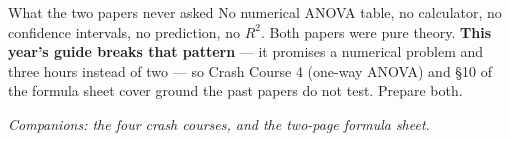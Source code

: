 \documentclass[11pt]{article}
\begin{document}
\begin{idea}{What the two papers never asked}
No numerical ANOVA table, no calculator, no confidence intervals, no prediction, no $R^2$.
Both papers were pure theory. \textbf{This year's guide breaks that pattern} --- it promises
a numerical problem and three hours instead of two --- so Crash Course 4 (one-way ANOVA) and
\S10 of the formula sheet cover ground the past papers do not test. Prepare both.
\end{idea}

\vfill
\begin{center}\small\itshape
Companions: the four crash courses, and the two-page formula sheet.
\end{center}
\end{document}
